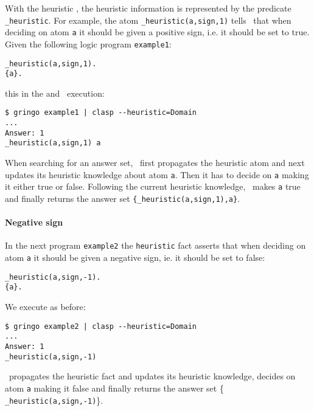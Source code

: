 With the heuristic , the heuristic information is represented by the predicate \texttt{\_heuristic}.  
For example, the atom \texttt{\_heuristic(a,sign,1)} tells  \clasp\ that  when deciding on atom \texttt{a} 
it should be given a positive sign, i.e. it should be set to true.  
Given the following logic program \texttt{example1}:
\begin{verbatim}
_heuristic(a,sign,1).
{a}.
\end{verbatim}
this in the \gringo and \clasp\ execution:
\begin{verbatim}
$ gringo example1 | clasp --heuristic=Domain
...
Answer: 1    
_heuristic(a,sign,1) a
\end{verbatim}

When searching for an answer set, \clasp\ first propagates the heuristic atom and next updates its heuristic knowledge about atom \texttt{a}. 
Then it has to decide on \texttt{a} making it either true or false. 
Following the current heuristic knowledge,  \clasp\ makes \texttt{a} true and finally returns the answer set \texttt{\{\_heuristic(a,sign,1),a\}}. 

\paragraph{Negative sign}

In the next program \texttt{example2} the \texttt{heuristic} fact  asserts that when deciding on atom \texttt{a}  
it should be given a negative sign, ie. it should be set to false: 
\begin{verbatim}
_heuristic(a,sign,-1).
{a}.
\end{verbatim}
We execute as before:
\begin{verbatim}
$ gringo example2 | clasp --heuristic=Domain                                                              
...
Answer: 1                                                                                                           
_heuristic(a,sign,-1)
\end{verbatim}
\clasp\ propagates the heuristic fact and updates its heuristic knowledge, 
decides on atom \texttt{a} making it false and finally returns the answer set \{ \texttt{\_heuristic(a,sign,-1)}\}. 


